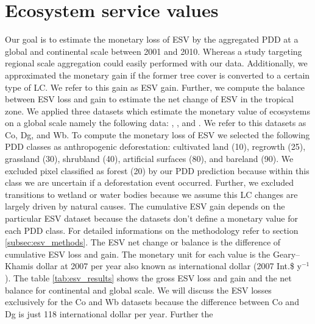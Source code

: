 	\section{Ecosystem service values}
		Our goal is to estimate the monetary loss of \ac{ESV} by the aggregated \ac{PDD} at a global and continental scale between 2001 and 2010. Whereas a study targeting regional scale aggregation could easily performed with our data. Additionally, we approximated the monetary gain if the former tree cover is converted to a certain type of \ac{LC}. We refer to this gain as \ac{ESV} gain. Further, we compute the balance between \ac{ESV} loss and gain to estimate the net change of \ac{ESV} in the tropical zone. We applied three datasets which estimate the monetary value of ecosystems on a global scale namely the following data: \citet{Groot2012}, \citet{Costanza2014}, and \citet{Siikamaki2015}. We refer to this datasets as Co, Dg, and Wb. To compute the monetary loss of \ac{ESV} we selected the following \ac{PDD} classes as anthropogenic deforestation: cultivated land (10), regrowth (25), grassland (30), shrubland (40), artificial surfaces (80), and bareland (90). We excluded pixel classified as forest (20) by our \ac{PDD} prediction because within this class we are uncertain if a deforestation event occurred. Further, we excluded transitions to wetland or water bodies because we assume this \ac{LC} changes are largely driven by natural causes. The cumulative \ac{ESV} gain depends on the particular \ac{ESV} dataset because the datasets don't define a monetary value for each \ac{PDD} class. For detailed informations on the methodology refer to section \ref{subsec:esv_methods}. The \ac{ESV} net change or balance is the difference of cumulative \ac{ESV} loss and gain. The monetary unit for each value is the Geary–Khamis dollar at 2007 per year also known as international dollar (2007 Int.\$ y$^{-1}$). The table \ref{tab:esv_results} shows the gross \ac{ESV} loss and gain and the net balance for continental and global scale. We will discuss the \ac{ESV} losses exclusively for the Co and Wb datasets because the difference between Co and Dg is just 118 international dollar per year. Further the 

